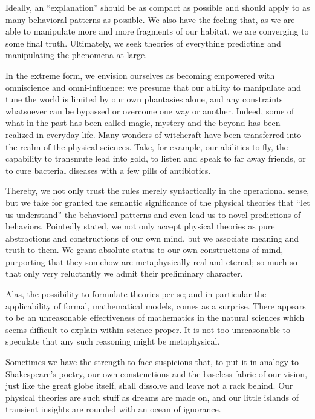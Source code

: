 \documentclass[rmp,amsfonts,showpacs,showkeys]{revtex4}
\begin{document}
Ideally, an ``explanation'' should be as compact as possible
and should apply to as many behavioral patterns as possible.
We also have the feeling that, as we are able to manipulate more and more fragments
of our habitat, we are converging to some final truth.
Ultimately, we seek theories of everything \cite{barrow-TOE}
predicting and manipulating the phenomena at large.

In the extreme form, we envision ourselves as becoming empowered with omniscience and omni-influence:
we presume that our ability to manipulate and tune the world is limited by our own phantasies alone,
and any constraints whatsoever can be bypassed or overcome one way or another.
Indeed, some of what in the past has been called magic, mystery and the beyond has been realized in everyday life.
Many wonders of witchcraft have been transferred into the realm of the physical sciences.
Take, for example, our abilities to fly,
the capability to transmute lead into gold,
to listen and speak to far away friends,
or to cure bacterial diseases with a few pills of antibiotics.

Thereby, we not only trust the rules merely syntactically in the operational sense,
but we take for granted the semantic significance of the physical theories that ``let us understand'' the
behavioral patterns and even lead us to novel predictions of behaviors.
Pointedly stated, we not only accept physical theories as pure abstractions and constructions of our own mind,
but we associate meaning and truth to them.
We grant absolute status to our own constructions of mind,
purporting that they somehow are metaphysically real and eternal;
so much so that only very reluctantly we admit their preliminary character.

Alas, the possibility to formulate theories per se;
and in particular the applicability of formal, mathematical models, comes as a surprise.
There appears to be an unreasonable effectiveness of mathematics in the natural sciences \cite{wigner}
which seems difficult to explain within science proper.
It is not too unreasonable to speculate that any such reasoning might be metaphysical.

Sometimes we have the strength to face suspicions that,
to put it in analogy to Shakespeare's poetry,
our own constructions and the baseless fabric of our vision,
just like the great globe itself, shall dissolve
and leave not a rack behind.
Our physical theories are such stuff as dreams are made on, and our little islands of transient insights
are rounded with an ocean of ignorance.
\end{document}
